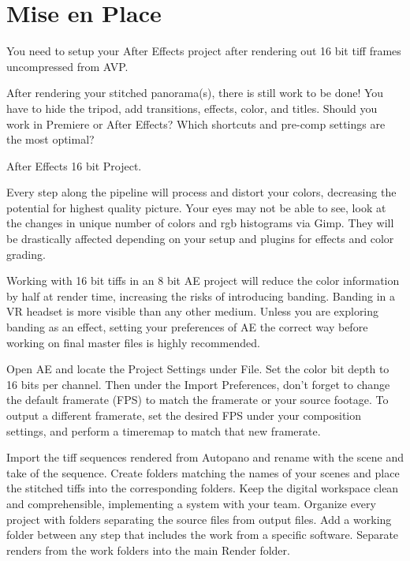 \chapter{Mise en Place}
\pagecolor{white}
\label{chap:47}
\begin{fullwidth}

\problem

{\large You need to setup your After Effects project after rendering out 16 bit tiff frames uncompressed from AVP. \par}

After rendering your stitched panorama(s), there is still work to be done! You have to hide the tripod, add transitions, effects, color, and titles. Should you work in Premiere or After Effects? Which shortcuts and pre-comp settings are the most optimal?

\solutions

{\large After Effects 16 bit Project. \par}

Every step along the pipeline will process and distort your colors, decreasing the potential for highest quality picture. Your eyes may not be able to see, look at the changes in unique number of colors and rgb histograms via Gimp. They will be drastically affected depending on your setup and plugins for effects and color grading.


Working with 16 bit tiffs in an 8 bit AE project will reduce the color information by half at render time, increasing the risks of introducing banding. Banding in a VR headset is more visible than any other medium. Unless you are exploring banding as an effect, setting your preferences of AE the correct way before working on final master files is highly recommended. 

Open AE and locate the Project Settings under File. Set the color bit depth to 16 bits per channel. Then under the Import Preferences, don't forget to change the default framerate (FPS) to match the framerate or your source footage. To output a different framerate, set the desired FPS under your composition settings, and perform a timeremap to match that new framerate.


Import the tiff sequences rendered from Autopano and rename with the scene and take of the sequence. Create folders matching the names of your scenes and place the stitched tiffs into the corresponding folders. Keep the digital workspace clean and comprehensible, implementing a system with your team. Organize every project with folders separating the source files from output files. Add a working folder between any step that includes the work from a specific software. Separate renders from the work folders into the main Render folder. 


\end{fullwidth}
